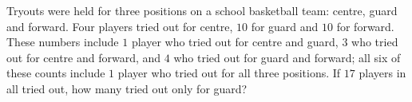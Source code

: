 Tryouts were held for three positions on a school basketball team: centre, guard and forward. Four players tried out for centre, $10$ for guard and $10$ for forward. These numbers include $1$ player who tried out for centre and guard, $3$ who tried out for centre and forward, and $4$ who tried out for guard and forward; all six of these counts include $1$ player who tried out for all three positions. If $17$ players in all tried out, how many tried out only for guard?
